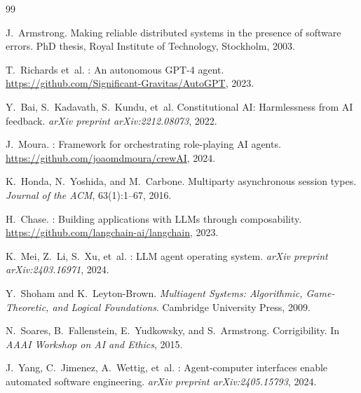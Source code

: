 \documentclass[12pt,a4paper]{article}
\theoremstyle{definition}
\begin{document}

\begin{thebibliography}{99}

J.~Armstrong.
\newblock Making reliable distributed systems in the presence of software errors.
\newblock PhD thesis, Royal Institute of Technology, Stockholm, 2003.

T.~Richards et~al.
: An autonomous GPT-4 agent.
\newblock \url{https://github.com/Significant-Gravitas/AutoGPT}, 2023.

Y.~Bai, S.~Kadavath, S.~Kundu, et~al.
\newblock Constitutional {AI}: Harmlessness from {AI} feedback.
\newblock \emph{arXiv preprint arXiv:2212.08073}, 2022.

J.~Moura.
: Framework for orchestrating role-playing AI agents.
\newblock \url{https://github.com/joaomdmoura/crewAI}, 2024.

K.~Honda, N.~Yoshida, and M.~Carbone.
\newblock Multiparty asynchronous session types.
\newblock \emph{Journal of the ACM}, 63(1):1--67, 2016.

H.~Chase.
: Building applications with {LLMs} through composability.
\newblock \url{https://github.com/langchain-ai/langchain}, 2023.

K.~Mei, Z.~Li, S.~Xu, et~al.
: {LLM} agent operating system.
\newblock \emph{arXiv preprint arXiv:2403.16971}, 2024.

Y.~Shoham and K.~Leyton-Brown.
\newblock \emph{Multiagent Systems: Algorithmic, Game-Theoretic, and Logical
  Foundations}.
\newblock Cambridge University Press, 2009.

N.~Soares, B.~Fallenstein, E.~Yudkowsky, and S.~Armstrong.
\newblock Corrigibility.
\newblock In \emph{AAAI Workshop on AI and Ethics}, 2015.

J.~Yang, C.~Jimenez, A.~Wettig, et~al.
: Agent-computer interfaces enable automated software engineering.
\newblock \emph{arXiv preprint arXiv:2405.15793}, 2024.

\end{thebibliography}
\end{document}
